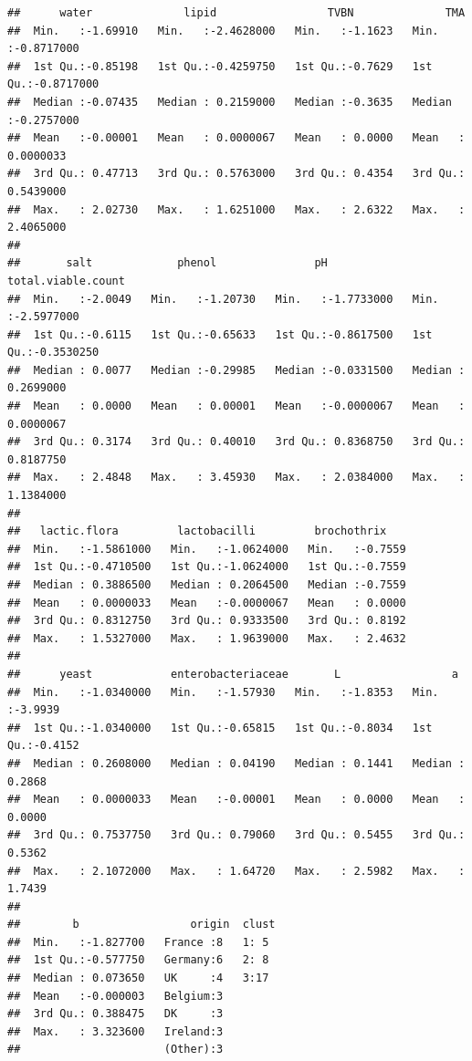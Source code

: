 \documentclass[
]{book}
\begin{document}
\begin{verbatim}
##      water              lipid                 TVBN              TMA            
##  Min.   :-1.69910   Min.   :-2.4628000   Min.   :-1.1623   Min.   :-0.8717000  
##  1st Qu.:-0.85198   1st Qu.:-0.4259750   1st Qu.:-0.7629   1st Qu.:-0.8717000  
##  Median :-0.07435   Median : 0.2159000   Median :-0.3635   Median :-0.2757000  
##  Mean   :-0.00001   Mean   : 0.0000067   Mean   : 0.0000   Mean   : 0.0000033  
##  3rd Qu.: 0.47713   3rd Qu.: 0.5763000   3rd Qu.: 0.4354   3rd Qu.: 0.5439000  
##  Max.   : 2.02730   Max.   : 1.6251000   Max.   : 2.6322   Max.   : 2.4065000  
##                                                                                
##       salt             phenol               pH             total.viable.count  
##  Min.   :-2.0049   Min.   :-1.20730   Min.   :-1.7733000   Min.   :-2.5977000  
##  1st Qu.:-0.6115   1st Qu.:-0.65633   1st Qu.:-0.8617500   1st Qu.:-0.3530250  
##  Median : 0.0077   Median :-0.29985   Median :-0.0331500   Median : 0.2699000  
##  Mean   : 0.0000   Mean   : 0.00001   Mean   :-0.0000067   Mean   : 0.0000067  
##  3rd Qu.: 0.3174   3rd Qu.: 0.40010   3rd Qu.: 0.8368750   3rd Qu.: 0.8187750  
##  Max.   : 2.4848   Max.   : 3.45930   Max.   : 2.0384000   Max.   : 1.1384000  
##                                                                                
##   lactic.flora         lactobacilli         brochothrix     
##  Min.   :-1.5861000   Min.   :-1.0624000   Min.   :-0.7559  
##  1st Qu.:-0.4710500   1st Qu.:-1.0624000   1st Qu.:-0.7559  
##  Median : 0.3886500   Median : 0.2064500   Median :-0.7559  
##  Mean   : 0.0000033   Mean   :-0.0000067   Mean   : 0.0000  
##  3rd Qu.: 0.8312750   3rd Qu.: 0.9333500   3rd Qu.: 0.8192  
##  Max.   : 1.5327000   Max.   : 1.9639000   Max.   : 2.4632  
##                                                             
##      yeast            enterobacteriaceae       L                 a          
##  Min.   :-1.0340000   Min.   :-1.57930   Min.   :-1.8353   Min.   :-3.9939  
##  1st Qu.:-1.0340000   1st Qu.:-0.65815   1st Qu.:-0.8034   1st Qu.:-0.4152  
##  Median : 0.2608000   Median : 0.04190   Median : 0.1441   Median : 0.2868  
##  Mean   : 0.0000033   Mean   :-0.00001   Mean   : 0.0000   Mean   : 0.0000  
##  3rd Qu.: 0.7537750   3rd Qu.: 0.79060   3rd Qu.: 0.5455   3rd Qu.: 0.5362  
##  Max.   : 2.1072000   Max.   : 1.64720   Max.   : 2.5982   Max.   : 1.7439  
##                                                                             
##        b                 origin  clust 
##  Min.   :-1.827700   France :8   1: 5  
##  1st Qu.:-0.577750   Germany:6   2: 8  
##  Median : 0.073650   UK     :4   3:17  
##  Mean   :-0.000003   Belgium:3         
##  3rd Qu.: 0.388475   DK     :3         
##  Max.   : 3.323600   Ireland:3         
##                      (Other):3
\end{verbatim}
\end{document}
